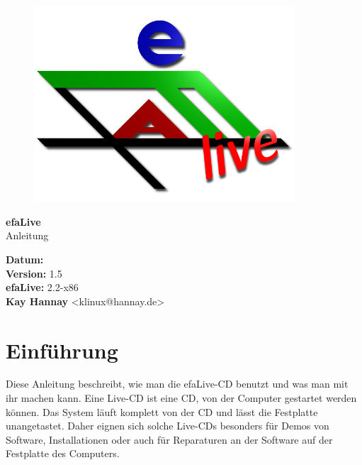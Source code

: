 \documentclass[a4paper,12pt,twoside]{article}
\title{\Title}
\author{\Author}
\date{\DocDate}
\begin{document}

\begin{titlepage}
    \vspace*{1cm}
    \begin{center}
        \begin{figure}
            \centering
            \includegraphics[width=9.745cm,height=7.308cm]{efaLivede-img/efaLivede-img1.png}
        \end{figure}
        \Huge
        \textbf{efaLive} \\[0.1cm]
        \LARGE
        Anleitung \\[5cm]
    \end{center}
    \normalsize
    \vspace*{4cm}
    \textbf{Datum:} {\DocDate} \\
    \textbf{Version:} 1.5 \\
    \textbf{efaLive:} 2.2-x86 \\
    \textbf{Kay Hannay} <klinux@hannay.de> \\
\end{titlepage}


\tableofcontents
\clearpage\setcounter{page}{1}
\section{Einführung}
\label{sct:einfuehrung}
Diese Anleitung beschreibt, wie man die efaLive-CD benutzt und was man
mit ihr machen kann. Eine Live-CD ist eine CD, von der Computer
gestartet werden können. Das System läuft komplett von der CD und lässt
die Festplatte unangetastet. Daher eignen sich solche Live-CDs
besonders für Demos von Software, Installationen oder auch für
Reparaturen an der Software auf der Festplatte des Computers.
\end{document}
